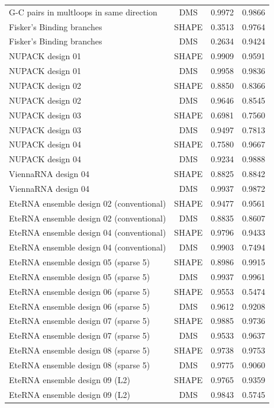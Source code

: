 \documentclass[letter]{bioinfo}
\begin{document}
\begin{center}
\begin{longtable}{lccc}
G-C pairs in multloops in same direction	&	DMS	&	0.9972 	&	0.9866 	\\
Fisker's Binding branches	&	SHAPE	&	0.3513 	&	0.9764 	\\
Fisker's Binding branches	&	DMS	&	0.2634 	&	0.9424 	\\
NUPACK design 01	&	SHAPE	&	0.9909 	&	0.9591 	\\
NUPACK design 01	&	DMS	&	0.9958 	&	0.9836 	\\
NUPACK design 02	&	SHAPE	&	0.8850 	&	0.8366 	\\
NUPACK design 02	&	DMS	&	0.9646 	&	0.8545 	\\
NUPACK design 03	&	SHAPE	&	0.6981 	&	0.7560 	\\
NUPACK design 03	&	DMS	&	0.9497 	&	0.7813 	\\
NUPACK design 04	&	SHAPE	&	0.7580 	&	0.9667 	\\
NUPACK design 04	&	DMS	&	0.9234 	&	0.9888 	\\
ViennaRNA design 04	&	SHAPE	&	0.8825 	&	0.8842 	\\
ViennaRNA design 04	&	DMS	&	0.9937 	&	0.9872 	\\
EteRNA ensemble design 02 (conventional)	&	SHAPE	&	0.9477 	&	0.9561 	 \\
EteRNA ensemble design 02 (conventional)	&	DMS	&	0.8835 	&	0.8607 	\\
EteRNA ensemble design 04 (conventional)	&	SHAPE	&	0.9796 	&	0.9433 	 \\
EteRNA ensemble design 04 (conventional)	&	DMS	&	0.9903 	&	0.7494 	\\
EteRNA ensemble design 05 (sparse 5)	&	SHAPE	&	0.8986 	&	0.9915 	\\
EteRNA ensemble design 05 (sparse 5)	&	DMS	&	0.9937 	&	0.9961 	\\
EteRNA ensemble design 06 (sparse 5)	&	SHAPE	&	0.9553 	&	0.5474 	\\
EteRNA ensemble design 06 (sparse 5)	&	DMS	&	0.9612 	&	0.9208 	\\
EteRNA ensemble design 07 (sparse 5)	&	SHAPE	&	0.9885 	&	0.9736 	\\
EteRNA ensemble design 07 (sparse 5)	&	DMS	&	0.9533 	&	0.9637 	\\
EteRNA ensemble design 08 (sparse 5)	&	SHAPE	&	0.9738 	&	0.9753 	\\
EteRNA ensemble design 08 (sparse 5)	&	DMS	&	0.9775 	&	0.9060 	\\
EteRNA ensemble design 09 (L2)	&	SHAPE	&	0.9765 	&	0.9359 	\\
EteRNA ensemble design 09 (L2)	&	DMS	&	0.9843 	&	0.5745 	\\

\end{longtable}
\end{center}
\end{document}
